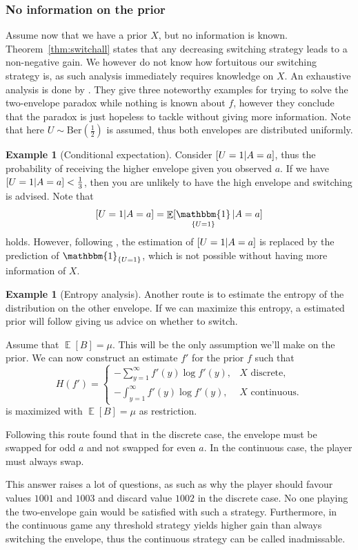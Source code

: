 \documentclass[twoside,a4paper]{article}
\theoremstyle{plain}
\theoremstyle{definition}
\newtheorem{example}[theorem]{Example}
\theoremstyle{remark}
\numberwithin{equation}{section}
\let\P\relax
\DeclareMathOperator{\P}{\mathbb{P}}
\DeclareMathOperator{\E}{\mathbb{E}}
\DeclareMathOperator{\1}{\mathbbm{1}}
\begin{document}
\subsubsection{No information on the prior}
Assume now that we have a prior $X$, but no information is known. Theorem~\ref{thm:switchall} states that any decreasing switching strategy leads to a non-negative gain. We however do not know how fortuitous our switching strategy is, as such analysis immediately requires knowledge on $X$. An exhaustive analysis is done by \cite{Albers05}. They give three noteworthy examples for trying to solve the two-envelope paradox while nothing is known about $f$, however they conclude that the paradox is just hopeless to tackle without giving more information. Note that here $U\sim\text{Ber}\left(\frac{1}{2}\right)$ is assumed, thus both envelopes are distributed uniformly.

\begin{example}[Conditional expectation]
Consider $\P[U=1|A=a]$, thus the probability of receiving the higher envelope given you observed $a$. If we have $\P[U=1|A=a]<\frac{1}{3}$, then you are unlikely to have the high envelope and switching is advised. Note that
\[\P[U=1|A=a]=\E[\1_{\{U=1\}}|A=a]\] holds. However, following \cite{Albers05}, the estimation of $\P[U=1|A=a]$ is replaced by the prediction of $\1_{\{U=1\}}$, which is not possible without having more information of $X$.
\end{example}
\begin{example}[Entropy analysis]
Another route is to estimate the entropy of the distribution on the other envelope. If we can maximize this entropy, a estimated prior will follow giving us advice on whether to switch.

Assume that $\E[B]=\mu$. This will be the only assumption we'll make on the prior. We can now construct an estimate $f'$ for the prior $f$ such that
\[
H(f')=\begin{cases}
-\sum_{y=1}^\infty f'(y)\log f'(y),&X\text{ discrete},\\
-\int_{y=1}^\infty f'(y)\log f'(y),&X\text{ continuous}.
\end{cases}
\]
is maximized with $\E[B]=\mu$ as restriction.

Following this route \cite{Albers05} found that in the discrete case, the envelope must be swapped for odd $a$ and not swapped for even $a$. In the continuous case, the player must always swap.

This answer raises a lot of questions, as such as why the player should favour values $1001$ and $1003$ and discard value $1002$ in the discrete case. No one playing the two-envelope gain would be satisfied with such a strategy. Furthermore, in the continuous game any threshold strategy yields higher gain than always switching the envelope, thus the continuous strategy can be called inadmissable.
\end{example}
\end{document}
